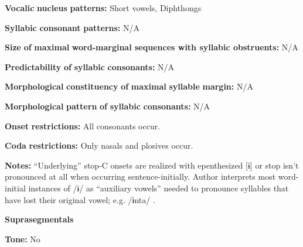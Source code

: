 \begin{styleBody}
\textbf{Vocalic} \textbf{nucleus} \textbf{patterns:} Short vowels, Diphthongs
\end{styleBody}

\begin{styleBody}
\textbf{Syllabic} \textbf{consonant} \textbf{patterns:} N/A
\end{styleBody}

\begin{styleBody}
\textbf{Size} \textbf{of} \textbf{maximal} \textbf{word{}-marginal sequences with syllabic obstruents:} N/A
\end{styleBody}

\begin{styleBody}
\textbf{Predictability} \textbf{of} \textbf{syllabic} \textbf{consonants:} N/A
\end{styleBody}

\begin{styleBody}
\textbf{Morphological} \textbf{constituency} \textbf{of} \textbf{maximal} \textbf{syllable} \textbf{margin:} N/A
\end{styleBody}

\begin{styleBody}
\textbf{Morphological} \textbf{pattern} \textbf{of} \textbf{syllabic} \textbf{consonants:} N/A
\end{styleBody}

\begin{styleBody}
\textbf{Onset} \textbf{restrictions:} All consonants occur.
\end{styleBody}

\begin{styleBody}
\textbf{Coda} \textbf{restrictions:} Only nasals and plosives occur.
\end{styleBody}

\begin{styleBody}
\textbf{Notes:} “Underlying” stop-C onsets are realized with epenthesized [ɨ] or stop isn’t pronounced at all when occurring sentence-initially. Author interprets most word-initial instances of /ɨ/ as “auxiliary vowels” needed to pronounce syllables that have lost their original vowel; e.g. /ɨnta/ \citep[26]{Courtz2008}.
\end{styleBody}

\begin{styleBody}
\textbf{Suprasegmentals}
\end{styleBody}

\begin{styleBody}
\textbf{Tone:} No
\end{styleBody}

